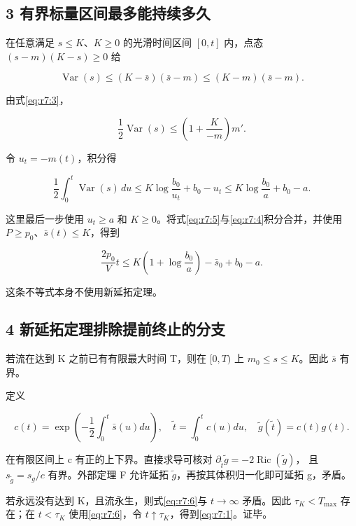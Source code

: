 \documentclass[UTF8,11pt,openany,oneside,fontset=none]{ctexbook}
\begin{document}
\subsection{3 有界标量区间最多能持续多久}\label{ch7:ux6709ux754cux6807ux91cfux533aux95f4ux6700ux591aux80fdux6301ux7eedux591aux4e45}

在任意满足 \(s\le K\)、\(K\ge0\) 的光滑时间区间 \([0,t]\) 内，点态 \((s-m)(K-s)\ge0\) 给

\[
 \operatorname{Var}(s)\le(K-\bar s)(\bar s-m)
                      \le(K-m)(\bar s-m).
\]

由式\eqref{eq:r7:3}，

\[
 \frac12\operatorname{Var}(s)
 \le\left(1+\frac{K}{-m}\right)m'.
\]

令 \(u_t=-m(t)\)，积分得

\[
 \frac12\int_0^t\operatorname{Var}(s)\,du
 \le K\log\frac{b_0}{u_t}+b_0-u_t
 \le K\log\frac{b_0}{a}+b_0-a.
\tag{7.5}\label{eq:r7:5}
\]

这里最后一步使用 \(u_t\ge a\) 和 \(K\ge0\)。将式\eqref{eq:r7:5}与\eqref{eq:r7:4}积分合并，并使用 \(P\ge p_0\)、\(\bar s(t)\le K\)，得到

\[
 \boxed{
 \frac{2p_0}{V}t
 \le K\left(1+\log\frac{b_0}{a}\right)-\bar s_0+b_0-a.
 }
\tag{7.6}\label{eq:r7:6}
\]

这条不等式本身不使用新延拓定理。

\subsection{4 新延拓定理排除提前终止的分支}\label{ch7:ux65b0ux5ef6ux62d3ux5b9aux7406ux6392ux9664ux63d0ux524dux7ec8ux6b62ux7684ux5206ux652f}

若流在达到 K 之前已有有限最大时间 T，则在 \([0,T)\) 上 \(m_0\le s\le K\)。因此 \(\bar s\) 有界。

定义

\[
 c(t)=\exp\left(-\frac12\int_0^t\bar s(u)du\right),
 \quad \widetilde t=\int_0^t c(u)du,
 \quad \widetilde g(\widetilde t)=c(t)g(t).
\]

在有限区间上 c 有正的上下界。直接求导可核对 \(\partial_{\widetilde t}\widetilde g=-2\operatorname{Ric}(\widetilde g)\)， 且 \(s_{\widetilde g}=s_g/c\) 有界。外部定理 F 允许延拓 \(\widetilde g\)，再按其体积归一化即可延拓 g，矛盾。

若永远没有达到 K，且流永生，则式\eqref{eq:r7:6}与 \(t\to\infty\) 矛盾。因此 \(\tau_K<T_{\max}\) 存在；在 \(t<\tau_K\) 使用\eqref{eq:r7:6}，令 \(t\uparrow\tau_K\)，得到\eqref{eq:r7:1}。证毕。
\end{document}
